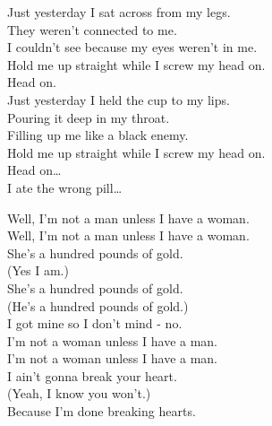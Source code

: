 \label{album:float-along-fill-your-lungs}




Just yesterday I sat across from my legs. \\
They weren't connected to me. \\
I couldn't see because my eyes weren't in me. \\
Hold me up straight while I screw my head on. \\

Head on. \\

Just yesterday I held the cup to my lips. \\
Pouring it deep in my throat. \\
Filling up me like a black enemy. \\
Hold me up straight while I screw my head on. \\

Head on… \\

I ate the wrong pill… \\




Well, I'm not a man unless I have a woman. \\
Well, I'm not a man unless I have a woman. \\

She's a hundred pounds of gold. \\
(Yes I am.) \\
She's a hundred pounds of gold. \\
(He's a hundred pounds of gold.) \\
I got mine so I don't mind - no. \\

I'm not a woman unless I have a man. \\
I'm not a woman unless I have a man. \\

I ain't gonna break your heart. \\
(Yeah, I know you won't.) \\
Because I'm done breaking hearts. \\

